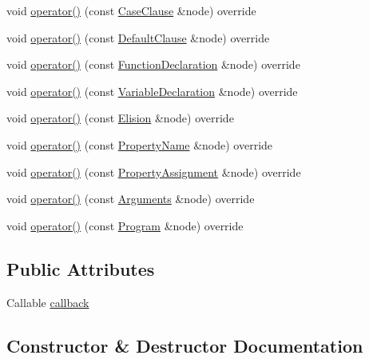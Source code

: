 \begin{DoxyCompactItemize}
\item 
void \hyperlink{struct_callable_visitor_a61efb29b38c0b4a1a46e392f1133013c}{operator()} (const \hyperlink{struct_case_clause}{Case\+Clause} \&node) override
\item 
void \hyperlink{struct_callable_visitor_ace58d18d6b2e0d27489b365db59e31ae}{operator()} (const \hyperlink{struct_default_clause}{Default\+Clause} \&node) override
\item 
void \hyperlink{struct_callable_visitor_a7d3ebcc10e02e0c9698170d957241846}{operator()} (const \hyperlink{struct_function_declaration}{Function\+Declaration} \&node) override
\item 
void \hyperlink{struct_callable_visitor_a81403b11d510563427191958e7a04d0b}{operator()} (const \hyperlink{struct_variable_declaration}{Variable\+Declaration} \&node) override
\item 
void \hyperlink{struct_callable_visitor_a72a62905dbd6c37719ab422462d7b8f5}{operator()} (const \hyperlink{struct_elision}{Elision} \&node) override
\item 
void \hyperlink{struct_callable_visitor_a2034a4d5531273c87f3fefbec8db6970}{operator()} (const \hyperlink{struct_property_name}{Property\+Name} \&node) override
\item 
void \hyperlink{struct_callable_visitor_aa88ba8cf86d84ccbc23c995ecf87bea8}{operator()} (const \hyperlink{struct_property_assignment}{Property\+Assignment} \&node) override
\item 
void \hyperlink{struct_callable_visitor_aa70a97d5a44ecc30aac8fb97c12cabb6}{operator()} (const \hyperlink{struct_arguments}{Arguments} \&node) override
\item 
void \hyperlink{struct_callable_visitor_a37e48e9df8cb4cff6bc135e7402a7244}{operator()} (const \hyperlink{struct_program}{Program} \&node) override
\end{DoxyCompactItemize}
\subsection*{Public Attributes}
\begin{DoxyCompactItemize}
\item 
Callable \hyperlink{struct_callable_visitor_a52ce52c399eb34a2a16abec3361e48b8}{callback}
\end{DoxyCompactItemize}


\subsection{Constructor \& Destructor Documentation}
\mbox{\label{struct_callable_visitor_af9bd3a4132494b0c91dc4f7b46e5dd0e}} 
